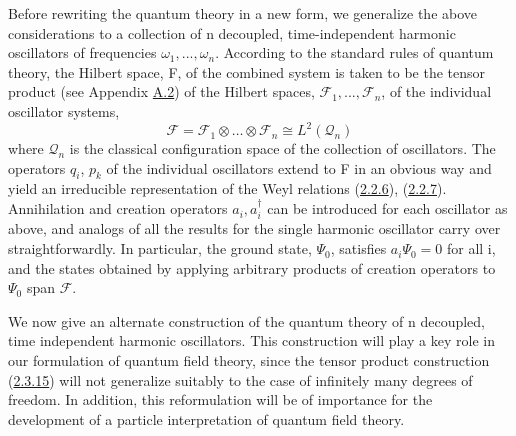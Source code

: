 \documentclass[11pt,a4paper]{article}
\begin{document}
Before rewriting the quantum theory in a new form, we generalize the above considerations to a collection of n decoupled, time-independent harmonic oscillators of frequencies \(\omega_1,...,\omega_n\). According to the standard rules of quantum theory, the Hilbert space, F, of the combined system is taken to be the tensor product (see Appendix \hyperlink{sec:A.2}{A.2}) of the Hilbert spaces, \(\mathcal{F}_1,...,\mathcal{F}_n\), of the individual oscillator systems,
\begin{equation*}
\mathcal{F} = \mathcal{F}_1 \otimes \ldots \otimes \mathcal{F}_n \cong L^2(\mathcal{Q}_n) \tag{2.3.15}\label{eq:2.3.15}
\end{equation*}
where \(\mathcal{Q}_n\) is the classical configuration space of the collection of oscillators. The operators \(q_i\), \(p_k\) of the individual oscillators extend to F in an obvious way and yield an irreducible representation of the Weyl relations (\hyperref[eq:2.2.6]{2.2.6}), (\hyperref[eq:2.2.7]{2.2.7}). Annihilation and creation operators \(a_i,a_i^{\dagger}\) can be introduced for each oscillator as above, and analogs of all the results for the single harmonic oscillator carry over straightforwardly. In particular, the ground state, \(\Psi_0\), satisfies \(a_i \Psi_0 = 0\) for all i, and the states obtained by applying arbitrary products of creation operators to \(\Psi_0\) span \(\mathcal{F}\).

We now give an alternate construction of the quantum theory of n decoupled, time independent harmonic oscillators. This construction will play a key role in our formulation of quantum field theory, since the tensor product construction (\hyperref[eq:2.3.15]{2.3.15}) will not generalize suitably to the case of infinitely many degrees of freedom. In addition, this reformulation will be of importance for the development of a particle interpretation of quantum field theory.
\end{document}
